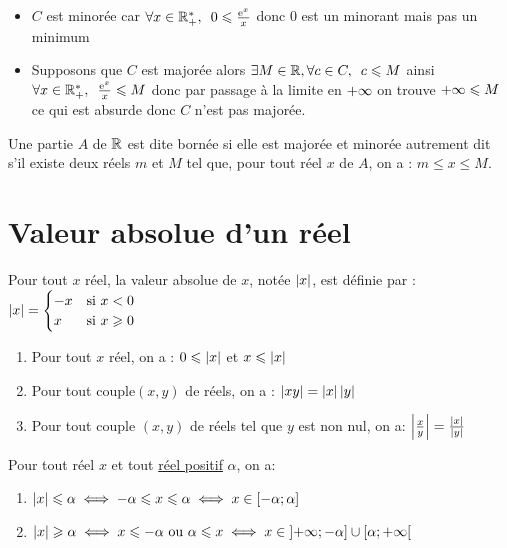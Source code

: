 \begin{corr}
	\begin{itemize}

		\item \(C\) est minorée car \( \quantifs{\forall x \in \Rps} 0 \leq \frac{\e{x}}{x} \) donc \(0\) est un minorant mais pas un minimum  \\
		\item Supposons que \(C\) est majorée alors \(\quantifs{\exists M \in \R,\forall c \in C} c\leq M \) ainsi \(\quantifs{\forall x \in \Rps} \frac{\e{x}}{x} \leq M \) donc par passage à la limite en \(+\infty\) on trouve \(+\infty \leqslant M\) ce qui est absurde donc \(C\) n'est pas majorée.
	\end{itemize}
\end{corr}

\begin{defi}
	Une partie \(A\) de \(\mathbb{R}\) est dite bornée si elle est majorée et minorée autrement dit s’il existe deux réels \(m\) et \(M\) tel que, pour tout réel \(x\) de \(A\), on a : \(m\leq x \leq M\).
\end{defi}

\section{Valeur absolue d'un réel}
\begin{defi}
	Pour tout \(x\) réel, la valeur absolue de \(x\), notée \(\left\lvert x\right\rvert\), est définie par : \(\left\lvert x\right\rvert = \begin{cases}
		-x & \text{si }  x < 0   \\
		x  & \text{si }  x\geqslant 0 \\
	\end{cases}\)
\end{defi}

\begin{prop}
	\begin{enumerate}
		\item Pour tout \(x\) réel, on a : \(0\leqslant\left\lvert x\right\rvert\) et \(x\leqslant\left\lvert x\right\rvert\)
		\item Pour tout couple\((x,y)\) de réels, on a : \(\left\lvert xy\right\rvert = \left\lvert x\right\rvert\left\lvert y\right\rvert\)
		\item Pour tout couple \((x,y)\) de réels tel que \(y\) est non nul, on a: \(\left\lvert\frac{x}{y}\right\rvert = \frac{\left\lvert x\right\rvert}{\left\lvert y\right\rvert}\)
	\end{enumerate}
\end{prop}

\begin{defprop}
	Pour tout réel \(x\) et tout \underline{réel positif} \(\alpha\), on a:
	\begin{enumerate}
		\item \(\left\lvert x\right\rvert\leqslant \alpha \iff -\alpha \leqslant x \leqslant \alpha \iff x \in \left[-\alpha;\alpha\right]\)
		\item \(\left\lvert x\right\rvert\geqslant \alpha \iff x \leqslant -\alpha\text{ ou } \alpha \leqslant x \iff x \in \left]+\infty;-\alpha\right]\cup\left[\alpha;+\infty\right[\)
	\end{enumerate}
\end{defprop}

